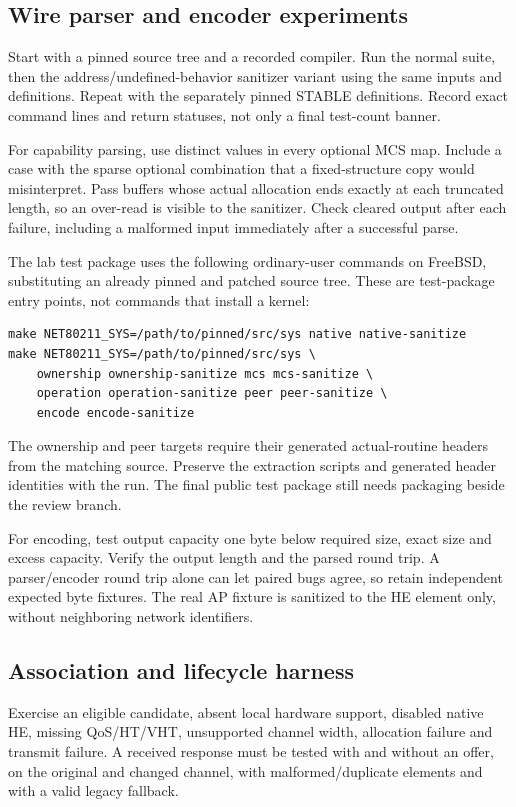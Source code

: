 \documentclass[11pt,letterpaper,oneside]{article}
\begin{document}
\subsection{Wire parser and encoder experiments}
Start with a pinned source tree and a recorded compiler. Run the normal suite, then the address/undefined-behavior sanitizer variant using the same inputs and definitions. Repeat with the separately pinned STABLE definitions. Record exact command lines and return statuses, not only a final test-count banner.

For capability parsing, use distinct values in every optional MCS map. Include a case with the sparse optional combination that a fixed-structure copy would misinterpret. Pass buffers whose actual allocation ends exactly at each truncated length, so an over-read is visible to the sanitizer. Check cleared output after each failure, including a malformed input immediately after a successful parse.

The lab test package uses the following ordinary-user commands on FreeBSD, substituting an already pinned and patched source tree. These are test-package entry points, not commands that install a kernel:
\begin{lstlisting}[caption={Native parser and pure-protocol suite entry points.}]
make NET80211_SYS=/path/to/pinned/src/sys native native-sanitize
make NET80211_SYS=/path/to/pinned/src/sys \
    ownership ownership-sanitize mcs mcs-sanitize \
    operation operation-sanitize peer peer-sanitize \
    encode encode-sanitize
\end{lstlisting}
The ownership and peer targets require their generated actual-routine headers from the matching source. Preserve the extraction scripts and generated header identities with the run. The final public test package still needs packaging beside the review branch.

For encoding, test output capacity one byte below required size, exact size and excess capacity. Verify the output length and the parsed round trip. A parser/encoder round trip alone can let paired bugs agree, so retain independent expected byte fixtures. The real AP fixture is sanitized to the HE element only, without neighboring network identifiers.

\subsection{Association and lifecycle harness}
Exercise an eligible candidate, absent local hardware support, disabled native HE, missing QoS/HT/VHT, unsupported channel width, allocation failure and transmit failure. A received response must be tested with and without an offer, on the original and changed channel, with malformed/duplicate elements and with a valid legacy fallback.
\end{document}

